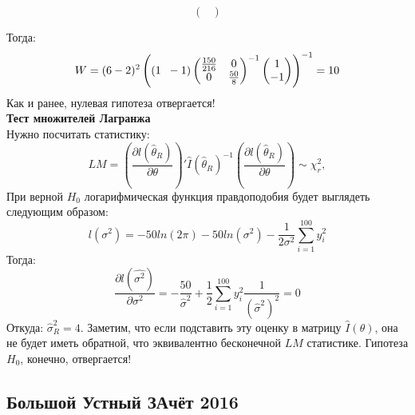 \documentclass[12pt, a4paper]{article}
\begin{document}
\begin{enumerate}
\[\begin{pmatrix}
\end{pmatrix}
\]

Тогда:
\[
W = (6-2)^2\left((1 \hspace{2mm} -1) \begin{pmatrix}
\frac{150}{216} & 0 \\
0 & \frac{50}{8}
\end{pmatrix}^{-1}
 \begin{pmatrix}
1 \\
-1
\end{pmatrix} \right)^{-1} = 10
\]
Как и ранее, нулевая гипотеза отвергается! \\
\textbf{Тест множителей Лагранжа}\\
Нужно посчитать статистику:
\[
LM = \left(\frac{\partial l(\hat{\theta}_R)}{\partial \theta}\right)'\hat{I}(\hat{\theta}_R)^{-1}\left(\frac{\partial l(\hat{\theta}_R)}{\partial \theta}\right) \sim \chi^2_r,
\]
При верной $H_0$ логарифмическая функция правдоподобия будет выглядеть следующим образом:
\[
l(\sigma^2) = -50ln(2\pi) - 50ln(\sigma^2) - \frac{1}{2\sigma^2}\sum \limits_{i=1}^{100}y_i^2
\]
Тогда:
\[
\frac{\partial l(\hat{\sigma^2})}{\partial \sigma^2} = -\frac{50}{\hat{\sigma}^2} + \frac{1}{2}\sum\limits_{i=1}^{100}y_i^2\frac{1}{(\hat{\sigma}^2)^2} = 0
\]
Откуда: $\hat{\sigma}^2_{R} = 4$. Заметим, что если подставить эту оценку в матрицу $\hat{I}(\theta)$, она не будет иметь обратной, что эквивалентно бесконечной $LM$ статистике. Гипотеза $H_0$, конечно, отвергается!

\end{enumerate}



\subsection{Большой Устный ЗАчёт 2016}
\end{document}

